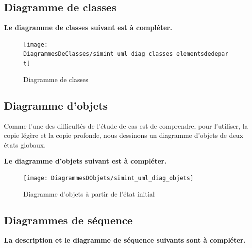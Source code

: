 \documentclass[11pt,article]{article}
\begin{document}
\subsection{Diagramme de classes}

{\color{red}\textbf{Le diagramme de classes suivant est à compléter.}}

\begin{figure}[h!]
\begin{center}
\texttt{[image: DiagrammesDeClasses/simint\_uml\_diag\_classes\_elementsdedepart]}
\caption{Diagramme de classes}
\end{center}
\label{umlet_diag_classes}
\end{figure}

\newpage

\subsection{Diagramme d'objets}

Comme l'une des difficultés de l'étude de cas est de comprendre, pour
l'utiliser, la copie légère et la copie profonde, nous dessinons un
diagramme d'objets de deux états globaux.

{\color{red}\textbf{Le diagramme d'objets suivant est à compléter.}}

\begin{figure}[h!]
\hspace{-1cm}\texttt{[image: DiagrammesDObjets/simint\_uml\_diag\_objets]}
\caption{Diagramme d'objets à partir de l'état initial}
\label{umlet_diag_classes}
\end{figure}

\newpage

\subsection{Diagrammes de séquence}

{\color{red}\textbf{La description et le diagramme de séquence suivants sont à compléter.}}
\end{document}
